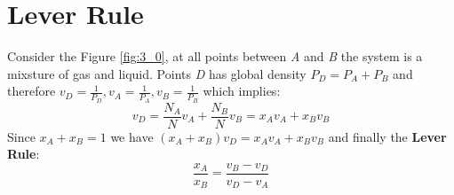 \documentclass[../main/main.tex]{subfiles}
\begin{document}


\section{Lever Rule}
Consider the Figure \ref{fig:3_0}, at all points between \emph{A} and \emph{B} the system is a mixsture of gas and liquid. Points \emph{D} has global density \( P_D = P_A + P_B \)  and therefore \( v_D = \frac{1}{P_D}, v_A = \frac{1}{P_A}, v_B = \frac{1}{P_B} \) which implies:
\begin{equation}
  v_D = \frac{N_A}{N} v_A + \frac{N_B}{N} v_B = x_A v_A + x_B v_B
  \label{eq:}
\end{equation}
Since \( x_A + x_B = 1 \) we have \( (x_A + x_B)v_D = x_A v_A + x_B v_B \) and finally the \textbf{Lever Rule}:
\begin{equation}
  \frac{x_A}{x_B} = \frac{v_B - v_D}{v_D - v_A}
  \label{eq:}
\end{equation}
\end{document}

